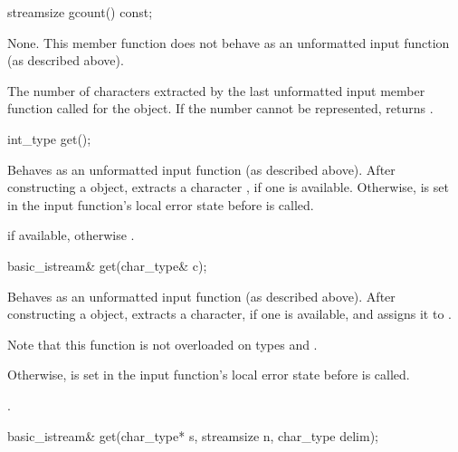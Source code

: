 %
\begin{itemdecl}
streamsize gcount() const;
\end{itemdecl}

\begin{itemdescr}
\pnum
\effects
None.
This member function does not behave as an unformatted
input function (as described above).

\pnum
\returns
The number of characters
extracted by the last unformatted input member function called for the object.
If the number cannot be represented,
returns .
\end{itemdescr}

%
\begin{itemdecl}
int_type get();
\end{itemdecl}

\begin{itemdescr}
\pnum
\effects
Behaves as an unformatted input function
(as described above).
After constructing a  object, extracts
a character , if one is available.
Otherwise,
 is set in the input function's local error state
before  is called.

\pnum
\returns
{} if available,
otherwise
.
\end{itemdescr}

%
\begin{itemdecl}
basic_istream& get(char_type& c);
\end{itemdecl}

\begin{itemdescr}
\pnum
\effects
Behaves as an unformatted input function
(as described above).
After constructing a  object, extracts
a character, if one is available, and assigns it to .
\begin{footnote}
Note
that this function is not overloaded on types
and
.
\end{footnote}
Otherwise,
 is set in the input function's local error state
before  is called.

\pnum
\returns
{}.
\end{itemdescr}

%
\begin{itemdecl}
basic_istream& get(char_type* s, streamsize n, char_type delim);
\end{itemdecl}

